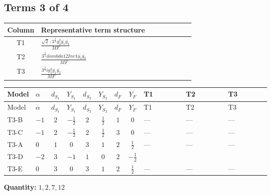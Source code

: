 \documentclass[8pt]{article}
\begin{document}
\begin{landscape}
\subsection*{Terms 3 of 4}
\begin{center}
\begin{tabular}{@{}c >{\raggedright\arraybackslash}p{0.82\linewidth}@{}}
\toprule
Column & Representative term structure \\
\midrule
T1 & \(\displaystyle \frac{\sqrt{2} \cdot 3^{\frac{3}{4}} g_{2}^{2} \overline{y_{1}} \overline{y_{2}}}{MF}\) \\
\midrule
T2 & \(\displaystyle \frac{3^{\frac{3}{4}} i lambda12Inv1 \overline{y_{1}} \overline{y_{2}}}{MF}\) \\
\midrule
T3 & \(\displaystyle \frac{3^{\frac{3}{4}} i g_{1}^{2} \overline{y_{1}} \overline{y_{2}}}{MF}\) \\
\midrule
\bottomrule
\end{tabular}
\end{center}
\smallskip
\tiny
\begin{longtable}{@{}llcccccc >{\raggedright\arraybackslash}p{0.21\linewidth} >{\raggedright\arraybackslash}p{0.21\linewidth} >{\raggedright\arraybackslash}p{0.21\linewidth}@{}}
\toprule
Model & $\alpha$ & $d_{S_1}$ & $Y_{S_1}$ & $d_{S_2}$ & $Y_{S_2}$ & $d_F$ & $Y_F$ & T1 & T2 & T3 \\
\midrule
\endfirsthead
\toprule
Model & $\alpha$ & $d_{S_1}$ & $Y_{S_1}$ & $d_{S_2}$ & $Y_{S_2}$ & $d_F$ & $Y_F$ & T1 & T2 & T3 \\
\midrule
\endhead
T3-B & $-1$ & $2$ & $-\frac{1}{2}$ & $2$ & $\frac{1}{2}$ & $1$ & $0$ & --- & --- & --- \\
\midrule
T3-C & $-1$ & $2$ & $-\frac{1}{2}$ & $2$ & $\frac{1}{2}$ & $3$ & $0$ & --- & --- & --- \\
\midrule
T3-A & $0$ & $1$ & $0$ & $3$ & $1$ & $2$ & $\frac{1}{2}$ & --- & --- & --- \\
\midrule
T3-D & $-2$ & $3$ & $-1$ & $1$ & $0$ & $2$ & $-\frac{1}{2}$ & \scriptsize\adjustbox{max width=\linewidth}{$\begin{gathered} - \frac{\sqrt{2} \cdot 3^{\frac{3}{4}} g_{2}^{2} \overline{y_{1}} \overline{y_{2}}}{6 MF}\end{gathered}$} & \scriptsize\adjustbox{max width=\linewidth}{$\begin{gathered} \frac{3^{\frac{3}{4}} i lambda12Inv1 \overline{y_{1}} \overline{y_{2}}}{6 MF}\end{gathered}$} & \scriptsize\adjustbox{max width=\linewidth}{$\begin{gathered} \frac{3^{\frac{3}{4}} i g_{1}^{2} \overline{y_{1}} \overline{y_{2}}}{8 MF}\end{gathered}$} \\
\midrule
T3-E & $0$ & $3$ & $0$ & $3$ & $1$ & $2$ & $\frac{1}{2}$ & --- & --- & --- \\
\midrule
\bottomrule
\end{longtable}
\clearpage
\noindent\textbf{Quantity: }$\mathrm{1,2,7,12}$\par\smallskip

\end{landscape}
\end{document}
